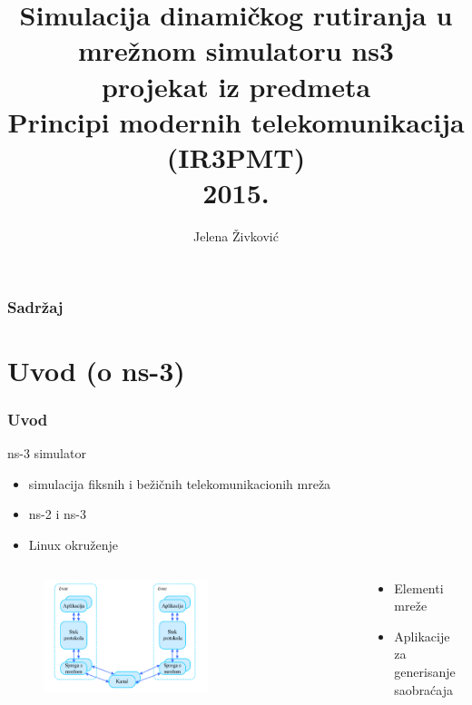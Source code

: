 \documentclass{beamer}
\title[Simulacija mre\v ze u ns-3 simulatoru \hspace{1em} {\scriptsize \insertframenumber\ / \inserttotalframenumber}]
{Simulacija dinami\v ckog rutiranja u mre\v znom simulatoru ns3\\[3ex]
\small
projekat iz predmeta\\
Principi modernih telekomunikacija (IR3PMT)\\
2015.}
\author[J. \v Zivkovi\' c --- IR3PMT 2015.]{Jelena \v Zivkovi\' c}
\date[]{}
\begin{document}
\begin{frame}
  \titlepage
\end{frame}


\begin{frame}
    \frametitle{Sadr\v zaj}
    \tableofcontents
\end{frame}


\section{Uvod (o ns-3)}

\begin{frame}
 \frametitle{Uvod}

\midskip 
\begin{block}{ns-3 simulator}
\begin{itemize}
	\item	simulacija fiksnih i be\v zi\v cnih telekomunikacionih mre\v za
	\item	ns-2 i ns-3
	\item	Linux okru\v zenje
  \end{itemize}
  \end{block}

\end{frame}
\begin{frame}
\begin{columns}[T]
   \begin{column}{.5\textwidth}
\begin{figure}[t]
		\includegraphics[width=0.6\textwidth]{slike/nov.png}
\end{figure}
 \end{column}

\begin{column}{.5\textwidth}

   \bigskip
   
   \bigskip
   
  \begin{block}{}
\begin{itemize}
   \item	Elementi mre\v ze
	\item	Aplikacije za generisanje saobra\' caja
  \end{itemize}
\end{block}{}
\end{column}
\end{columns}

\end{frame}
\end{document}
